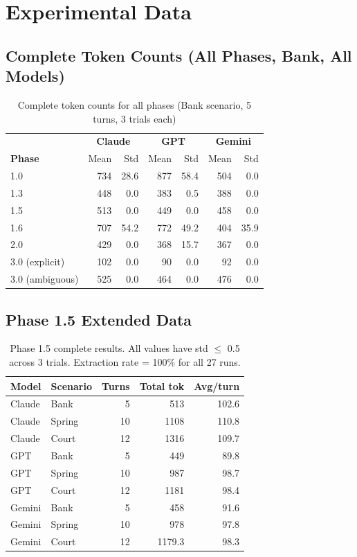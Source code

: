 \documentclass[11pt,a4paper]{article}
\begin{document}
\section{Experimental Data}
\label{app:data}

\subsection{Complete Token Counts (All Phases, Bank, All Models)}

\begin{table}[ht]
\centering
\small
\begin{tabular}{lrrrrrr}
\toprule
 & \multicolumn{2}{c}{\textbf{Claude}} & \multicolumn{2}{c}{\textbf{GPT}} & \multicolumn{2}{c}{\textbf{Gemini}} \\
\textbf{Phase} & Mean & Std & Mean & Std & Mean & Std \\
\midrule
1.0 & 734 & 28.6 & 877 & 58.4 & 504 & 0.0 \\
1.3 & 448 & 0.0 & 383 & 0.5 & 388 & 0.0 \\
1.5 & 513 & 0.0 & 449 & 0.0 & 458 & 0.0 \\
1.6 & 707 & 54.2 & 772 & 49.2 & 404 & 35.9 \\
2.0 & 429 & 0.0 & 368 & 15.7 & 367 & 0.0 \\
3.0 (explicit) & 102 & 0.0 & 90 & 0.0 & 92 & 0.0 \\
3.0 (ambiguous) & 525 & 0.0 & 464 & 0.0 & 476 & 0.0 \\
\bottomrule
\end{tabular}
\caption{Complete token counts for all phases (Bank scenario, 5 turns, 3 trials each)}
\label{tab:all_tokens}
\end{table}

\subsection{Phase 1.5 Extended Data}

\begin{table}[ht]
\centering
\begin{tabular}{llrrr}
\toprule
\textbf{Model} & \textbf{Scenario} & \textbf{Turns} & \textbf{Total tok} & \textbf{Avg/turn} \\
\midrule
Claude & Bank & 5 & 513 & 102.6 \\
Claude & Spring & 10 & 1108 & 110.8 \\
Claude & Court & 12 & 1316 & 109.7 \\
GPT & Bank & 5 & 449 & 89.8 \\
GPT & Spring & 10 & 987 & 98.7 \\
GPT & Court & 12 & 1181 & 98.4 \\
Gemini & Bank & 5 & 458 & 91.6 \\
Gemini & Spring & 10 & 978 & 97.8 \\
Gemini & Court & 12 & 1179.3 & 98.3 \\
\bottomrule
\end{tabular}
\caption{Phase 1.5 complete results. All values have std $\leq$ 0.5 across 3 trials.
Extraction rate = 100\% for all 27 runs.}
\label{tab:phase1_5_extended}
\end{table}
\end{document}
